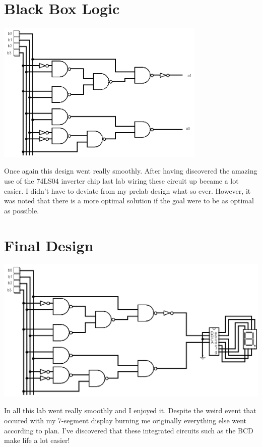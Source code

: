 \documentclass[11pt]{article}
\begin{document}
\section*{Black Box Logic}
\begin{center}
\includegraphics[width=10cm, keepaspectratio]{BlackBox}\newline
\end{center}
Once again this design went really smoothly. After having discovered the amazing use of the 74LS04 inverter chip
last lab wiring these circuit up became a lot easier. I didn't have to deviate from my prelab design what so ever.
However, it was noted that there is a more optimal solution if the goal were to be as optimal as possible.
\newpage
\section*{Final Design}
\begin{center}
\includegraphics[width=14cm, keepaspectratio]{Final}\newline
\end{center}
In all this lab went really smoothly and I enjoyed it. Despite the weird event that occured with my 7-segment display
burning me originally everything else went according to plan. I've discovered that these integrated circuits such as
the BCD make life a lot easier!
\end{document}

